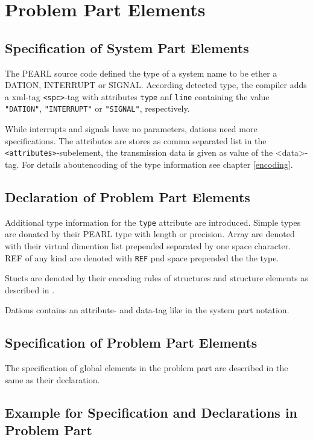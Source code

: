 \section{Problem Part Elements}
\subsection{Specification of System Part Elements}
The PEARL source code defined the type of a system name to be ether a DATION, 
INTERRUPT or SIGNAL. According detected type, the compiler 
adds a xml-tag \verb|<spc>|-tag with attributes \verb|type| anf \verb|line|
containing the value \verb|"DATION"|, \verb|"INTERRUPT"| or \verb|"SIGNAL"|,
 respectively.

While interrupts and signals have no parameters, dations need more
specifications. The attributes are stores as comma separated list in the
\verb|<attributes>|-subelement, the transmission data is given as value
of the <data>-tag. For details aboutencoding of the type information
see chapter \ref{encoding}. 

\subsection{Declaration of Problem Part Elements}

Additional type information for the \verb|type| attribute are introduced.
Simple types are donated by their PEARL type with length or precision.
Array are denoted with their virtual dimention list prepended separated by
one space character.
REF of any kind are denoted with  \texttt{REF} pnd space prepended the the
type.

Stucts are denoted by their encoding rules of
structures and structure elements  as described in \cite{runtime}.

Dations contains an attribute- and data-tag like in the system part notation.

\subsection{Specification of Problem Part Elements}
The specification of global  elements in the problem part are described 
in the same as their declaration.

\subsection{Example for Specification and Declarations in Problem Part}

